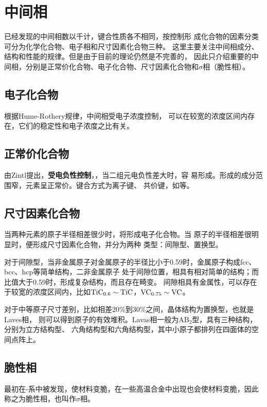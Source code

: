     \section{中间相}
        已经发现的中间相数以千计，键合性质各不相同，按控制形
        成化合物的因素分类可分为化学化合物、电子相和尺寸因素化合物三种。
        这里主要关注中间相成分、结构和性能的规律。但是由于目前的理论仍然是不完善的，
        因此只介绍重要的中间相，分别是正常价化合物、电子化合物、尺寸因素化合物和$\sigma$相（脆性相）。
        \subsection{电子化合物}
            根据Hume-Rothery规律，中间相受电子浓度控制，
            可以在较宽的浓度区间内存在，它们的稳定性和电子浓度之比有关。
        \subsection{正常价化合物}
            由Zintl提出，\textbf{受电负性控制}，，当二组元电负性差大时，容
            易形成。形成的成分范围窄，元素呈正常价。键合方式为离子键、
            共价键，如等。
        \subsection{尺寸因素化合物}
            当两种元素的原子半径相差很少时，将形成电子化合物。当
            原子的半径相差很明显时，便形成尺寸因素化合物，并分为两种
            类型：间隙型、置换型。

            对于间隙型，当非金属原子对金属原子的半径比小于0.59时，金属原子构成fcc、bcc、hcp等简单结构，二非金属原子
            处于间隙位置，相具有相对简单的结构；而比值大于0.59时，形成复杂结构，而且存在畸变。
            间隙相具有金属性，可以存在于较宽的浓度区间内，比如$\ce{TiC_{0.6}}\sim\ce{TiC}$，$\ce{VC_{0.75}}\sim\ce{VC}$。

            对于中等原子尺寸差别，比如相差20\%到30\%之间，晶体结构为置换型，也就是Laves相，
            则可以得到原子的有效堆积。Lavas相一般为$\mathrm{AB}_2$型，具有三种结构，分别为立方结构型、
            六角结构型和六角结构型，其中小原子都排列在四面体的空间点阵上。
        \subsection{脆性相}
            最初在-系中被发现，使材料变脆，在一些高温合金中出现也会使材料变脆，因此
            称之为脆性相，也叫作$\sigma$相。

